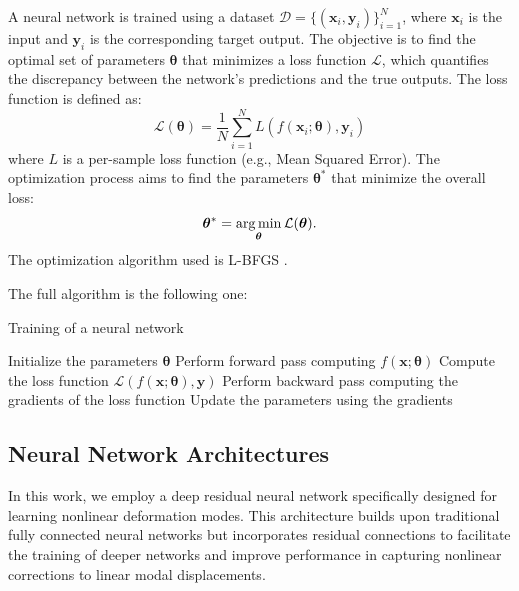A neural network is trained using a dataset \( \mathcal{D} = \{(\bm{x}_i, \bm{y}_i)\}_{i=1}^N \), where \( \bm{x}_i \) is the input and \( \bm{y}_i \) is the corresponding target output. The objective is to find the optimal set of parameters \( \bm{\theta} \) that minimizes a loss function \( \mathcal{L} \), which quantifies the discrepancy between the network's predictions and the true outputs. The loss function is defined as:
\begin{equation}
    \mathcal{L}(\bm{\theta}) = \frac{1}{N} \sum_{i=1}^N L(f(\bm{x}_i; \bm{\theta}), \bm{y}_i)
\end{equation}
where \( L \) is a per-sample loss function (e.g., Mean Squared Error). The optimization process aims to find the parameters \( \bm{\theta}^* \) that minimize the overall loss:
\begin{equation}
    \bm{\theta}^* = \operatorname*{arg\,min}_{\bm{\theta}} \mathcal{L}(\bm{\theta}).
\end{equation}
The optimization algorithm used is L-BFGS \cite{Liu_1989}.

The full algorithm is the following one:
\begin{algorithm} 
    \caption{Training of a neural network}
    \begin{algorithmic}
        \State Initialize the parameters \( \bm{\theta} \)
                \State Perform forward pass computing \( f(\bm{x}; \bm{\theta}) \)
                \State Compute the loss function \( \mathcal{L}(f(\bm{x}; \bm{\theta}), \bm{y}) \)
                \State Perform backward pass computing the gradients of the loss function
                \State Update the parameters using the gradients
            \EndFor
        \EndWhile
    \end{algorithmic}
\end{algorithm}



\subsection{Neural Network Architectures}
In this work, we employ a deep residual neural network specifically designed for learning nonlinear deformation modes. This architecture builds upon traditional fully connected neural networks but incorporates residual connections to facilitate the training of deeper networks and improve performance in capturing nonlinear corrections to linear modal displacements.


